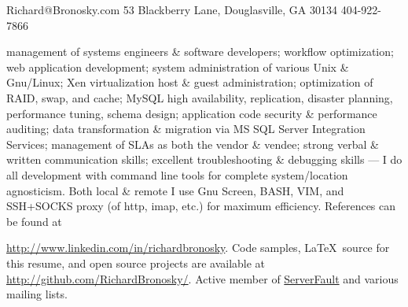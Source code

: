 \documentclass[10pt]{article}
\begin{document}
{Richard@Bronosky.com}
{53 Blackberry Lane, Douglasville, GA 30134}
{404-922-7866}

\begin{longtext}
    management of systems engineers \& software developers;
    workflow optimization;
    web application development;
    system administration of various Unix \& Gnu/Linux;
    Xen virtualization host \& guest administration;
    optimization of RAID, swap, and cache;
    MySQL high availability, replication, disaster planning, performance tuning, schema design;
    application code security \& performance auditing;
    data transformation \& migration via MS SQL Server Integration Services;
    management of SLAs as both the vendor \& vendee;
    strong verbal \& written communication skills;
    excellent troubleshooting \& debugging skills
    \halfskip
    --- I do all development with command line tools for complete system/location
        agnosticism. Both local \& remote I use Gnu Screen, BASH, VIM, and SSH+SOCKS proxy (of http, imap, etc.) for maximum efficiency.
        References can be found at

        \href{http://www.linkedin.com/in/richardbronosky}{http://www.linkedin.com/in/richardbronosky}.
        Code samples, \LaTeX\ source for this resume, and open source projects are available at \href{http://github.com/RichardBronosky/}{http://github.com/RichardBronosky/}.
        Active member of \href{http://serverfault.com/users/4131/richard-bronosky#answers}{ServerFault} and various mailing lists.
        \shortspace
\end{longtext}



\end{document}
